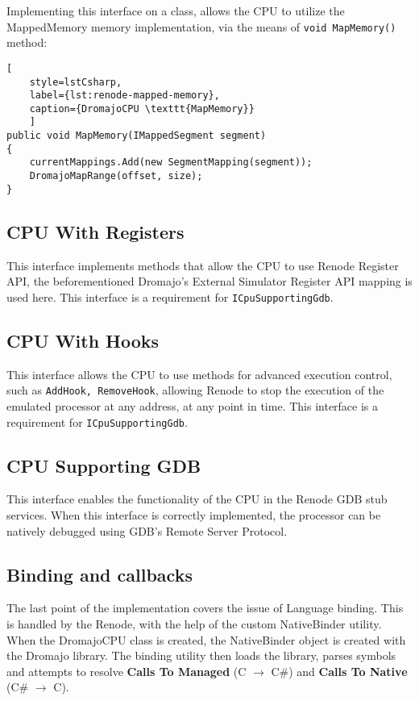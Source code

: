 \noindent
Implementing this interface on a class, allows the CPU to utilize the MappedMemory memory implementation, via the means
of \texttt{void MapMemory()} method:

\begin{lstlisting}[
    style=lstCsharp,
    label={lst:renode-mapped-memory},
    caption={DromajoCPU \texttt{MapMemory}}
    ]
public void MapMemory(IMappedSegment segment)
{
    currentMappings.Add(new SegmentMapping(segment));
    DromajoMapRange(offset, size);
}
\end{lstlisting}

\subsection*{CPU With Registers}
This interface implements methods that allow the CPU to use Renode Register API, the beforementioned Dromajo's External
Simulator Register API mapping is used here. This interface is a requirement for \texttt{ICpuSupportingGdb}.

\subsection*{CPU With Hooks}
This interface allows the CPU to use methods for advanced execution control, such as \texttt{AddHook, RemoveHook},
allowing Renode to stop the execution of the emulated processor at any address, at any point in time.
This interface is a requirement for \texttt{ICpuSupportingGdb}.

\pagebreak

\subsection*{CPU Supporting GDB}

This interface enables the functionality of the CPU in the Renode GDB stub services. When this interface is correctly
implemented, the processor can be natively debugged using GDB's Remote Server Protocol.

\subsection{Binding and callbacks}

The last point of the implementation covers the issue of Language binding. This is handled by the Renode, with the help
of the custom NativeBinder utility. When the DromajoCPU class is created, the NativeBinder object is created with
the Dromajo library. The binding utility then loads the library, parses symbols and attempts to resolve
\textbf{Calls To Managed} (C $\rightarrow$ C\#) and \textbf{Calls To Native} (C\# $\rightarrow$ C).

